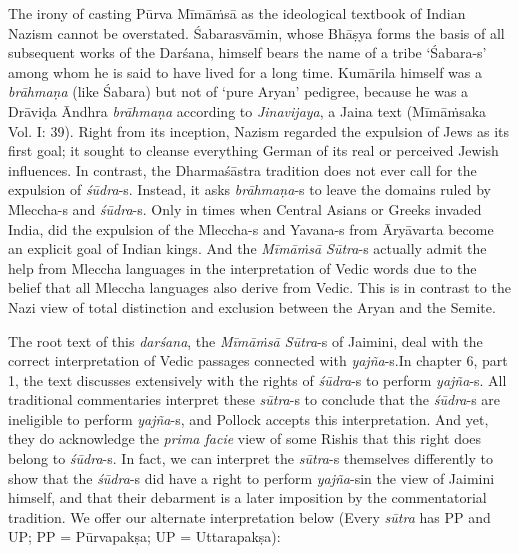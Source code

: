 The irony of casting Pūrva Mīmāṁsā as the ideological textbook of Indian Nazism cannot be overstated. Śabarasvāmin, whose Bhāṣya forms the basis of all subsequent works of the Darśana, himself bears the name of a tribe ‘Śabara-s’ among whom he is said to have lived for a long time. Kumārila himself was a \textit{brāhmaṇa} (like Śabara) but not of ‘pure Aryan’ pedigree, because he was a Drāviḍa Āndhra \textit{brāhmaṇa} according to \textit{Jinavijaya}, a Jaina text (Mīmāṁsaka Vol. I: 39). Right from its inception, Nazism regarded the expulsion of Jews as its first goal; it sought to cleanse everything German of its real or perceived Jewish influences. In contrast, the Dharmaśāstra tradition does not ever call for the expulsion of \textit{śūdra}-s. Instead, it asks \textit{brāhmaṇa}-s to leave the domains ruled by Mleccha-s and \textit{śūdra}-s. Only in times when Central Asians or Greeks invaded India, did the expulsion of the Mleccha-s and Yavana-s from Āryāvarta become an explicit goal of Indian kings. And the \textit{Mīmāṁsā Sūtra}-s actually admit the help from Mleccha languages in the interpretation of Vedic words due to the belief that all Mleccha languages also derive from Vedic. This is in contrast to the Nazi view of total distinction and exclusion between the Aryan and the Semite.

The root text of this \textit{darśana}, the \textit{Mīmāṁsā Sūtra}-s of Jaimini, deal with the correct interpretation of Vedic passages connected with \textit{yajña}-s.\break In chapter 6, part 1, the text discusses extensively with the rights of \textit{śūdra}-s to perform \textit{yajña}-s. All traditional commentaries interpret these \textit{sūtra}-s to conclude that the \textit{śūdra}-s are ineligible to perform \textit{yajña}-s, and Pollock accepts this interpretation. And yet, they do acknowledge the \textit{prima facie} view of some Rishis that this right does belong to \textit{śūdra}-s. In fact, we can interpret the \textit{sūtra}-s themselves differently to show that the \textit{śūdra}-s did have a right to perform \textit{yajña}-s\break in the view of Jaimini himself, and that their debarment is a later imposition by the commentatorial tradition. We offer our alternate interpretation below (Every \textit{sūtra} has PP and UP; PP = Pūrvapakṣa; UP = Uttarapakṣa):

